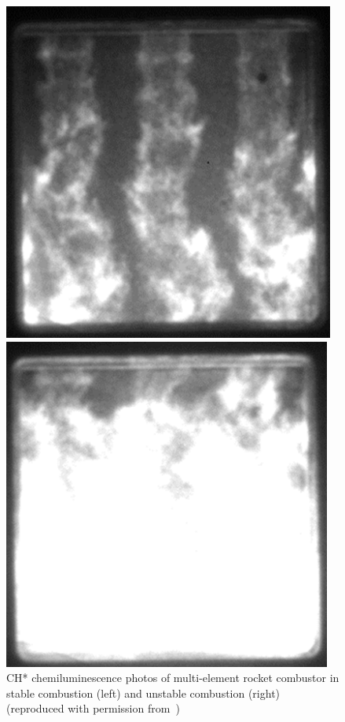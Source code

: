 \begin{figure}
	\begin{minipage}{0.49\linewidth}
		\includegraphics[width=0.98\linewidth]{Chapters/Overview/Images/orth_chChem_stable.png}
	\end{minipage}
	\begin{minipage}{0.49\linewidth}
		\includegraphics[width=0.99\linewidth]{Chapters/Overview/Images/orth_chChem_unstable.png}
	\end{minipage}
	\caption{\label{fig:orthCombustor} CH* chemiluminescence photos of multi-element rocket combustor in stable combustion (left) and unstable combustion (right) (reproduced with permission from~\cite{Orth2018})}
\end{figure}

